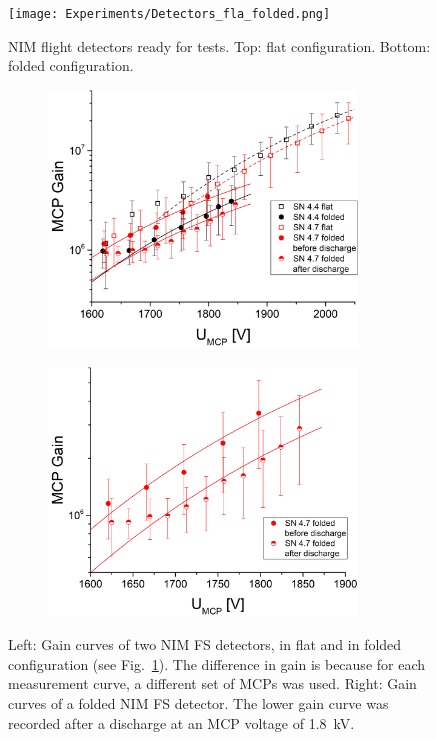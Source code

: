 	\begin{figure}[h] %
		\centering
		\texttt{[image: Experiments/Detectors\_fla\_folded.png]}
		\caption{NIM flight detectors ready for tests. Top: flat configuration. Bottom: folded configuration.}
		\label{fig:DetFlatFolded}
	\end{figure}
	\begin{figure}[h!] %
		\begin{subfigure}{.5\textwidth}
			\centering
			\includegraphics[width=0.9\textwidth]{Experiments/Gain_Curves_SN4p5_4p7.png}
		\end{subfigure}
		\begin{subfigure}{.5\textwidth}
			\centering
			\includegraphics[width=0.9\textwidth]{Experiments/SN4p7_discharge.png}
		\end{subfigure}
		\caption{Left: Gain curves of two NIM FS detectors, in flat and in folded configuration (see Fig.~\ref{fig:DetFlatFolded}). The difference in gain is because for each measurement curve, a different set of MCPs was used. Right: Gain curves of a folded NIM FS detector. The lower gain curve was recorded after a discharge at an MCP voltage of 1.8~kV.}
		\label{fig:SN4p54p7Gain}
	\end{figure}
